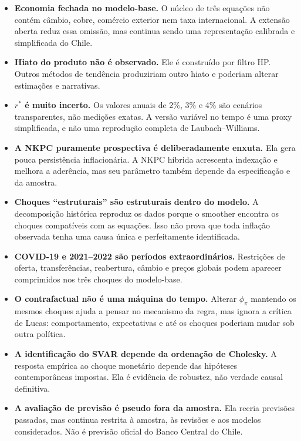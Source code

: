 \documentclass[11pt,a4paper]{article}
\begin{document}
\begin{itemize}
  \item \textbf{Economia fechada no modelo-base.} O núcleo de três equações não contém câmbio,
        cobre, comércio exterior nem taxa internacional. A extensão aberta reduz essa omissão,
        mas continua sendo uma representação calibrada e simplificada do Chile.
  \item \textbf{Hiato do produto não é observado.} Ele é construído por filtro HP. Outros métodos
        de tendência produziriam outro hiato e poderiam alterar estimações e narrativas.
  \item \textbf{\(r^\ast\) é muito incerto.} Os valores anuais de 2\%, 3\% e 4\% são cenários
        transparentes, não medições exatas. A versão variável no tempo é uma proxy simplificada,
        e não uma reprodução completa de Laubach--Williams.
  \item \textbf{A NKPC puramente prospectiva é deliberadamente enxuta.} Ela gera pouca
        persistência inflacionária. A NKPC híbrida acrescenta indexação e melhora a aderência,
        mas seu parâmetro também depende da especificação e da amostra.
  \item \textbf{Choques ``estruturais'' são estruturais dentro do modelo.} A decomposição histórica
        reproduz os dados porque o smoother encontra os choques compatíveis com as equações. Isso
        não prova que toda inflação observada tenha uma causa única e perfeitamente identificada.
  \item \textbf{COVID-19 e 2021--2022 são períodos extraordinários.} Restrições de oferta,
        transferências, reabertura, câmbio e preços globais podem aparecer comprimidos nos três
        choques do modelo-base.
  \item \textbf{O contrafactual não é uma máquina do tempo.} Alterar \(\phi_\pi\) mantendo os
        mesmos choques ajuda a pensar no mecanismo da regra, mas ignora a crítica de Lucas:
        comportamento, expectativas e até os choques poderiam mudar sob outra política.
  \item \textbf{A identificação do SVAR depende da ordenação de Cholesky.} A resposta empírica ao
        choque monetário depende das hipóteses contemporâneas impostas. Ela é evidência de
        robustez, não verdade causal definitiva.
  \item \textbf{A avaliação de previsão é pseudo fora da amostra.} Ela recria previsões passadas,
        mas continua restrita à amostra, às revisões e aos modelos considerados. Não é previsão
        oficial do Banco Central do Chile.

\end{itemize}
\end{document}
